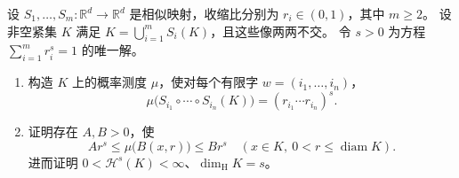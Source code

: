 \begin{optionalexercise}\label{b1:ex:15-separated-similarities}
设 \(S_1,\ldots,S_m:\mathbb R^d\to\mathbb R^d\) 是相似映射，收缩比分别为 \(r_i\in(0,1)\)，其中 \(m\ge2\)。
设非空紧集 \(K\) 满足 \(K=\bigcup_{i=1}^mS_i(K)\)，且这些像两两不交。
令 \(s>0\) 为方程 \(\sum_{i=1}^mr_i^s=1\) 的唯一解。
\begin{enumerate}
\item\label{b1:item:15-similar-natural-measure}
构造 \(K\) 上的概率测度 \(\mu\)，使对每个有限字 \(w=(i_1,\ldots,i_n)\)，
\[
 \mu\bigl(S_{i_1}\circ\cdots\circ S_{i_n}(K)\bigr)
 =(r_{i_1}\cdots r_{i_n})^s.
\]
\item\label{b1:item:15-similar-ball-growth}
证明存在 \(A,B>0\)，使
\[
 Ar^s\le\mu\bigl(B(x,r)\bigr)\le Br^s
 \quad(x\in K,\ 0<r\le\operatorname{diam}K).
\]
进而证明 \(0<\mathcal H^s(K)<\infty\)、\(\dim_{\mathrm H}K=s\)。
\end{enumerate}
\end{optionalexercise}
